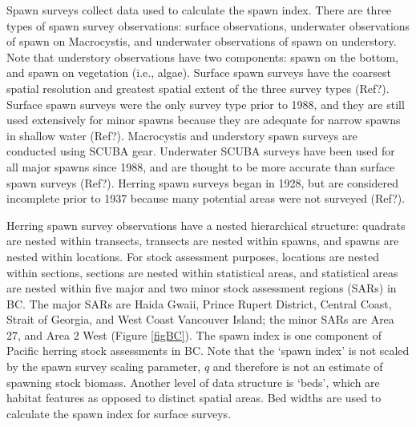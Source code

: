 \documentclass[12pt]{article}
\begin{document}
Spawn surveys collect data used to calculate the spawn index.
There are three types of spawn survey observations: surface observations, underwater observations of spawn on Macrocystis, and underwater observations of spawn on understory.
Note that understory observations have two components: spawn on the bottom, and spawn on vegetation (i.e., algae).
Surface spawn surveys have the coarsest spatial resolution and greatest spatial extent of the three survey types (Ref?).
Surface spawn surveys were the only survey type prior to 1988, and they are still used extensively for minor spawns because they are adequate for narrow spawns in shallow water (Ref?).
Macrocystis and understory spawn surveys are conducted using SCUBA gear.
Underwater SCUBA surveys have been used for all major spawns since 1988, and are thought to be more accurate than surface spawn surveys (Ref?).
Herring spawn surveys began in 1928, but are considered incomplete prior to 1937 because many potential areas were not surveyed (Ref?).

Herring spawn survey observations have a nested hierarchical structure: quadrats are nested within transects, transects are nested within spawns, and spawns are nested within locations.
For stock assessment purposes, locations are nested within sections, sections are nested within statistical areas, and statistical areas are nested within five major and two minor stock assessment regions (SARs) in BC.
The major SARs are Haida Gwaii, Prince Rupert District, Central Coast, Strait of Georgia, and West Coast Vancouver Island; the minor SARs are Area 27, and Area 2 West (Figure \ref{figBC}).
The spawn index is one component of Pacific herring stock assessments in BC.
Note that the `spawn index' is not scaled by the spawn survey scaling parameter, $q$ \citeyearpar[CSAS][]{CSAS2015b} and therefore is not an estimate of spawning stock biomass.
Another level of data structure is `beds', which are habitat features as opposed to distinct spatial areas.
Bed widths are used to calculate the spawn index for surface surveys.
\end{document}
